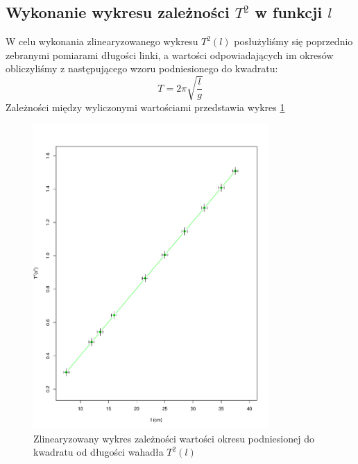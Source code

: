 \documentclass{fizraport}
\begin{document}
\subsection{Wykonanie wykresu zależności $T^2$ w funkcji $l$}
W celu wykonania zlinearyzowanego wykresu  $T^2(l)$ posłużyliśmy się poprzednio zebranymi pomiarami długości linki, a wartości odpowiadających im okresów obliczyliśmy z następującego wzoru podniesionego do kwadratu:
%
\[ T = 2\pi \sqrt{\frac{l}{g}} \]
%
Zależności między wyliczonymi wartościami przedstawia wykres \figurename{\ref{fig:w3}}
\begin{figure}[htbp]
 \centering
 \includegraphics[width=0.8\textwidth,keepaspectratio=true]{wykres2.pdf}
   \caption{Zlinearyzowany wykres zależności wartości okresu podniesionej do kwadratu od długości wahadła $T^2(l)$}
 \label{fig:w3}
\end{figure}
\pagebreak
\end{document}
